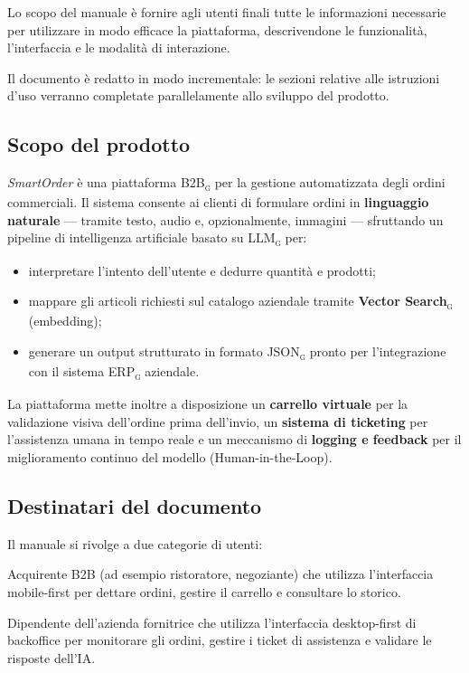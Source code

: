 \documentclass[a4paper, 11pt, oneside]{scrartcl}
\begin{document}
Lo scopo del manuale \`e fornire agli utenti finali tutte le informazioni necessarie per utilizzare in modo efficace la piattaforma, descrivendone le funzionalit\`a, l'interfaccia e le modalit\`a di interazione.

Il documento \`e redatto in modo incrementale: le sezioni relative alle istruzioni d'uso verranno completate parallelamente allo sviluppo del prodotto.

\subsection{Scopo del prodotto}
\textit{SmartOrder} \`e una piattaforma B2B\textsubscript{\textsc{g}} per la gestione automatizzata degli ordini commerciali. Il sistema consente ai clienti di formulare ordini in \textbf{linguaggio naturale} --- tramite testo, audio e, opzionalmente, immagini --- sfruttando un pipeline di intelligenza artificiale basato su LLM\textsubscript{\textsc{g}} per:

\begin{itemize}[noitemsep]
    \item interpretare l'intento dell'utente e dedurre quantit\`a e prodotti;
    \item mappare gli articoli richiesti sul catalogo aziendale tramite \textbf{Vector Search}\textsubscript{\textsc{g}} (embedding);
    \item generare un output strutturato in formato JSON\textsubscript{\textsc{g}} pronto per l'integrazione con il sistema ERP\textsubscript{\textsc{g}} aziendale.
\end{itemize}

La piattaforma mette inoltre a disposizione un \textbf{carrello virtuale} per la validazione visiva dell'ordine prima dell'invio, un \textbf{sistema di ticketing} per l'assistenza umana in tempo reale e un meccanismo di \textbf{logging e feedback} per il miglioramento continuo del modello (Human-in-the-Loop).

\subsection{Destinatari del documento}
Il manuale si rivolge a due categorie di utenti:

\begin{description}[style=nextline]
    \item[\textbf{Cliente}] Acquirente B2B (ad esempio ristoratore, negoziante) che utilizza l'interfaccia mobile-first per dettare ordini, gestire il carrello e consultare lo storico.
    \item[\textbf{Operatore}] Dipendente dell'azienda fornitrice che utilizza l'interfaccia desktop-first di backoffice per monitorare gli ordini, gestire i ticket di assistenza e validare le risposte dell'IA.
\end{description}
\end{document}

